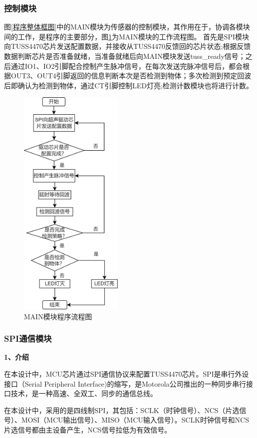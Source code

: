     \subsubsection{控制模块}
    图\ref{程序整体框图}中的MAIN模块为传感器的控制模块，其作用在于，协调各模块间的工作，是程序的主要部分，图\ref{MAIN模块程序流程图}为MAIN模块的工作流程图。
    首先是SPI模块向TUSS4470芯片发送配置数据，并接收从TUSS4470反馈回的芯片状态;根据反馈数据判断芯片是否准备就绪，当准备就绪后向MAIN模块发送tuss\_ready信号；之后通过IO1、IO2引脚配合控制产生脉冲信号，在每次发送完脉冲信号后，都会根据OUT3、OUT4引脚返回的信息判断本次是否检测到物体；多次检测到预定回波后即确认为检测到物体，通过CT引脚控制LED灯亮;检测计数模块也将进行计数。
    \begin{figure}[H]
        \centering
        \includegraphics[width=5cm]{figure/MAIN module flow chart.png}
        \songti{}\caption{MAIN模块程序流程图}
        \label{MAIN模块程序流程图}
    \end{figure}
    
    
    
    \subsubsection{SPI通信模块}
    \noindent
    \textbf{1、介绍}\par
    在本设计中，MCU芯片通过SPI通信协议来配置TUSS4470芯片。SPI是串行外设接口（Serial Peripheral Interface)的缩写，是Motorola公司推出的一种同步串行接口技术，是一种高速、全双工、同步的通信总线。\par
    在本设计中，采用的是四线制SPI，其包括：SCLK（时钟信号）、NCS（片选信号）、MOSI（MCU输出信号）、MISO（MCU输入信号）。SCLK时钟信号和NCS片选信号都由主设备产生，NCS信号拉低为有效信号。
    
